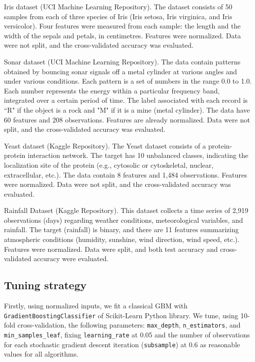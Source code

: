 \documentclass[11pt,a4paper]{article}
\begin{document}
Iris dataset (UCI Machine Learning Repository). The dataset consists of 50 samples from each of three species of Iris (Iris setosa, Iris virginica, and Iris versicolor). Four features were measured from each sample: the length and the width of the sepals and petals, in centimetres. Features were normalized. Data were not split, and the cross-validated accuracy was evaluated.

Sonar dataset (UCI Machine Learning Repository). The data contain patterns obtained by bouncing sonar signals off a metal cylinder at various angles and under various conditions. Each pattern is a set of numbers in the range 0.0 to 1.0. Each number represents the energy within a particular frequency band, integrated over a certain period of time. The label associated with each record is “R" if the object is a rock and "M" if it is a mine (metal cylinder). The data have 60 features and 208 observations. Features are already normalized. Data were not split, and the cross-validated accuracy was evaluated.

Yeast dataset (Kaggle Repository). The Yeast dataset consists of a protein-protein interaction network. The target has 10 unbalanced classes, indicating the localization site of the protein (e.g., cytosolic or cytoskeletal, nuclear, extracellular, etc.). The data contain 8 features and 1,484 observations. Features were normalized. Data were not split, and the cross-validated accuracy was evaluated.

Rainfall Dataset (Kaggle Repository). This dataset collects a time series of 2,919 observations (days) regarding weather conditions, meteorological variables, and rainfall. The target (rainfall) is binary, and there are 11 features summarizing atmospheric conditions (humidity, sunshine, wind direction, wind speed, etc.). Features were normalized. Data were split, and both test accuracy and cross-validated accuracy were evaluated.



\subsection*{Tuning strategy}
Firstly, using normalized inputs, we fit a classical GBM with \texttt{GradientBoostingClassifier} of Scikit-Learn Python library.
We tune, using 10-fold cross-validation, the following parameters:  \texttt{max\_depth}, \texttt{n\_estimators}, and \texttt{min\_samples\_leaf}, fixing \texttt{learning\_rate} at 0.05 and the number of observations for each stochastic gradient descent iteration (\texttt{subsample}) at 0.6 as reasonable values for all algorithms.
\end{document}
